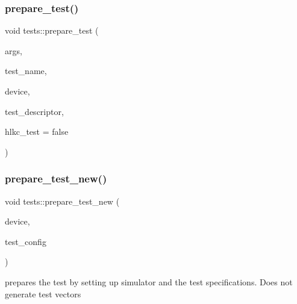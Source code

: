 \mbox{\label{namespacetests_a2b5f0d073bc48ee9649948c6426531a0}} 
\subsubsection{\texorpdfstring{prepare\+\_\+test()}{prepare\_test()}}
{\footnotesize\ttfamily void tests\+::prepare\+\_\+test (\begin{DoxyParamCaption}\item[{\hyperlink{structtests_1_1TestArgs}{tests\+::\+Test\+Args} \&}]{args,  }\item[{std\+::string}]{test\+\_\+name,  }\item[{\hyperlink{classllk_1_1Device}{llk\+::\+Device} \&}]{device,  }\item[{Y\+A\+M\+L\+::\+Node \&}]{test\+\_\+descriptor,  }\item[{bool}]{hlkc\+\_\+test = {\ttfamily false} }\end{DoxyParamCaption})}

\mbox{\label{namespacetests_a569c10d43808a8b64a7a86927c89a9b0}} 
\subsubsection{\texorpdfstring{prepare\+\_\+test\+\_\+new()}{prepare\_test\_new()}}
{\footnotesize\ttfamily void tests\+::prepare\+\_\+test\+\_\+new (\begin{DoxyParamCaption}\item[{\hyperlink{classllk_1_1Device}{llk\+::\+Device} \&}]{device,  }\item[{\hyperlink{structtests_1_1TestConfig}{tests\+::\+Test\+Config} \&}]{test\+\_\+config }\end{DoxyParamCaption})}



prepares the test by setting up simulator and the test specifications. Does not generate test vectors 

\mbox{\label{namespacetests_a6515d12a8b88dec9d8a56bc221672fd6}} 
